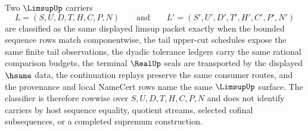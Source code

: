 \begin{definition}
\label{def:limsup-classifier}
Two $\LimsupUp$ carriers
$$
L=(S,U,D,T,H,C,P,N)
\qquad\text{and}\qquad
L'=(S',U',D',T',H',C',P',N')
$$
are classified as the same displayed limsup packet exactly when the bounded sequence rows match componentwise, the tail upper-cut schedules expose the same finite tail observations, the dyadic tolerance ledgers carry the same rational comparison budgets, the terminal $\RealUp$ seals are transported by the displayed $\hsame$ data, the continuation replays preserve the same consumer routes, and the provenance and local NameCert rows name the same $\LimsupUp$ surface. The classifier is therefore rowwise over $S,U,D,T,H,C,P,N$ and does not identify carriers by host sequence equality, quotient streams, selected cofinal subsequences, or a completed supremum construction.
\end{definition}

